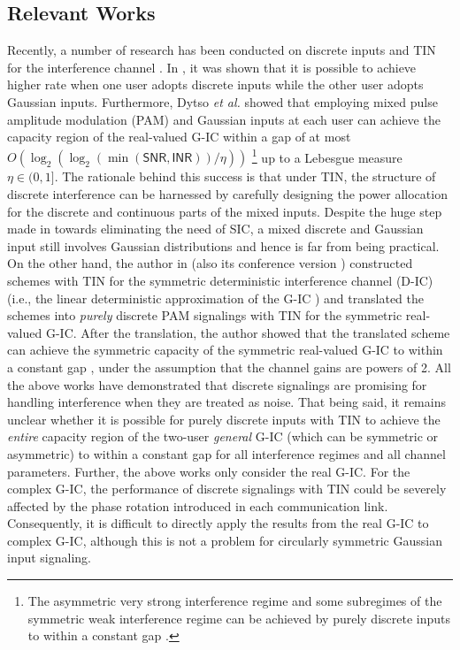\documentclass[12pt, draftclsnofoot, onecolumn]{IEEEtran}
\newcommand{\msf}[1]{\mathsf{#1}}
\newcommand{\SNR}{\msf{SNR}}
\newcommand{\INR}{\msf{INR}}
\theoremstyle{definition}
\begin{document}
\subsection{Relevant Works}
Recently, a number of research has been conducted on discrete inputs and TIN for the interference channel \cite{6939682,7282748,7451210,ShuoLithesis}. In \cite{6939682}, it was shown that it is possible to achieve higher rate when one user adopts discrete inputs while the other user adopts Gaussian inputs. Furthermore, Dytso \textit{et al.} \cite{7451210} showed that employing mixed pulse amplitude modulation (PAM) and Gaussian inputs at each user can achieve the capacity region of the real-valued G-IC within a gap of at most $O(\log_2(\log_2(\min(\SNR,\INR))/\eta))$ \footnote{The asymmetric very strong interference regime and some subregimes of the symmetric weak interference regime can be achieved by purely discrete inputs to within a constant gap \cite{7451210}.} up to a Lebesgue measure $\eta \in (0,1]$. The rationale behind this success is that under TIN, the structure of discrete interference can be harnessed by carefully designing the power allocation for the discrete and continuous parts of the mixed inputs. Despite the huge step made in \cite{7451210} towards eliminating the need of SIC, a mixed discrete and Gaussian input still involves Gaussian distributions and hence is far from being practical. On the other hand, the author in \cite{ShuoLithesis} (also its conference version \cite{7282748}) constructed schemes with TIN for the symmetric deterministic interference channel (D-IC) \cite{doi:10.1002/ett.1287} (i.e., the linear deterministic approximation of the G-IC \cite{Avestimehr11}) and translated the schemes into \emph{purely} discrete PAM signalings with TIN for the symmetric real-valued G-IC. After the translation, the author showed that the translated scheme can achieve the symmetric capacity of the symmetric real-valued G-IC to within a constant gap \cite{ShuoLithesis}, under the assumption that the channel gains are powers of 2. All the above works have demonstrated that discrete signalings are promising for handling interference when they are treated as noise. That being said, it remains unclear whether it is possible for purely discrete inputs with TIN to achieve the \emph{entire} capacity region of the two-user \textit{general} G-IC (which can be symmetric or asymmetric) to within a constant gap for all interference regimes and all channel parameters. Further, the above works only consider the real G-IC. For the complex G-IC, the performance of discrete signalings with TIN could be severely affected by the phase rotation introduced in each communication link. Consequently, it is difficult to directly apply the results from the real G-IC to complex G-IC, although this is not a problem for circularly symmetric Gaussian input signaling.
\end{document}
